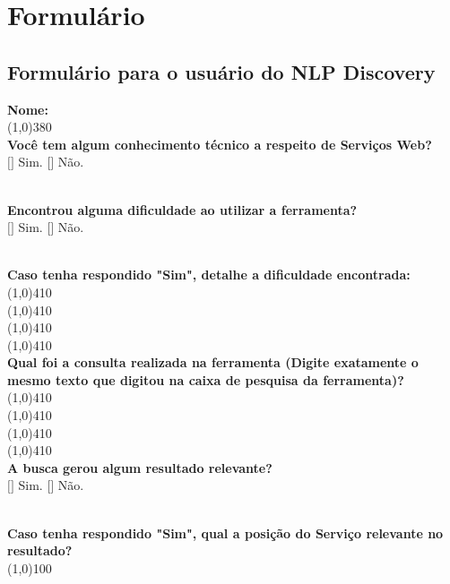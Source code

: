 \chapter{Formulário}
\label{ap:formulario}


\def \tick{
$[$\hspace{0.3cm}$]$
}

\def \twooption#1#2{
\tick #1.  \tick #2.
}

\def \threeoption#1#2#3{
\tick #1.\newline
\tick #2.\newline
\tick #3.
}

\def \fouroption#1#2#3#4{
\tick #1.\newline
\tick #2.\newline
\tick #3.\newline
\tick #4.
}

\def \fiveoption#1#2#3#4#5{
\tick #1.\newline
\tick #2.\newline
\tick #3.\newline
\tick #4.\newline
\tick #5.
}
\def \datefield{
    /\hspace{0.4cm}/
}

\def \rcolor{
    \rowcolor[gray]{0.9}
}

\def \hcolor{
    \rowcolor[gray]{0.7}
}


\section{Formulário para o usuário do NLP Discovery}
\label{ap:sec:feedback}

\textbf{Nome: }
\\
\line(1,0){380}
\\
\textbf{Você tem algum conhecimento técnico a respeito de Serviços Web? }
\\
\twooption{Sim}{Não}
\\
\textbf{Encontrou alguma dificuldade ao utilizar a ferramenta?}
\\
\twooption{Sim}{Não}
\\
\textbf{Caso tenha respondido "Sim", detalhe a dificuldade encontrada:}
\\
\line(1,0){410}
\\
\line(1,0){410}
\\
\line(1,0){410}
\\
\line(1,0){410}
\\
\textbf{Qual foi a consulta realizada na ferramenta (Digite exatamente o mesmo texto que digitou na caixa de pesquisa da ferramenta)?  }
\\
\line(1,0){410}
\\
\line(1,0){410}
\\
\line(1,0){410}
\\
\line(1,0){410}
\\
\textbf{A busca gerou algum resultado relevante?}
\\
\twooption{Sim}{Não}
\\
\textbf{Caso tenha respondido "Sim", qual a posição do Serviço relevante no resultado?}
\\
\line(1,0){100}
\\
